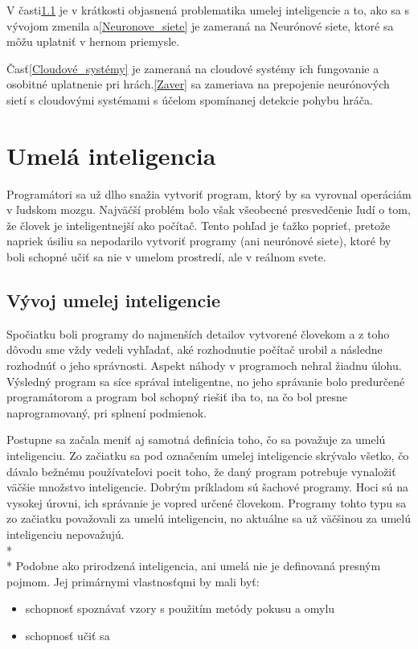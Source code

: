 \documentclass[10pt,twoside,slovak,coursepaper]{article}
\begin{document}
V časti\ref{umela_inteligencia_1} je v krátkosti objasnená problematika umelej inteligencie a to, ako sa s vývojom zmenila a\ref{Neuronove_siete} je zameraná na Neurónové siete, ktoré sa môžu uplatniť v hernom priemysle.  

Časť\ref{Cloudové_systémy} je zameraná na cloudové systémy ich fungovanie a osobitné uplatnenie pri hrách.\ref{Zaver} sa zameriava na prepojenie neurónových sietí s cloudovými systémami s účelom spomínanej detekcie pohybu hráča.

\section{Umelá inteligencia} \label{Umela_inteligencia}
Programátori sa už dlho snažia vytvoriť program, ktorý by sa vyrovnal operáciám v ľudskom mozgu. Najväčší problém bolo však všeobecné presvedčenie ľudí o tom, že človek je inteligentnejší ako počítač\cite{Kvasnička:NS}. Tento pohľad je ťažko poprieť, pretože napriek úsiliu sa nepodarilo vytvoriť programy (ani neurónové siete), ktoré by boli schopné učiť sa nie v umelom prostredí, ale v reálnom svete.
\subsection{Vývoj umelej inteligencie} \label{umela_inteligencia_1}
Spočiatku boli programy do najmenších detailov vytvorené človekom a z toho dôvodu sme vždy vedeli vyhľadať, aké rozhodnutie počítač urobil a následne rozhodnúť o jeho správnosti. Aspekt náhody v programoch nehral žiadnu úlohu. Výsledný program sa síce správal inteligentne, no jeho správanie bolo predurčené programátorom a program bol schopný riešiť iba to, na čo bol presne naprogramovaný, pri splnení podmienok. 

Postupne sa začala meniť aj samotná definícia toho, čo sa považuje za umelú inteligenciu. Zo začiatku sa pod označením umelej inteligencie skrývalo všetko, čo dávalo bežnému používateľovi pocit toho, že daný program potrebuje vynaložiť väčšie množstvo inteligencie. Dobrým príkladom sú šachové programy. Hoci sú na vysokej úrovni, ich správanie je vopred určené človekom. Programy tohto typu sa zo začiatku považovali za umelú inteligenciu, no aktuálne sa už väčšinou za umelú inteligenciu nepovažujú. 
\\*
\\*
Podobne ako prirodzená inteligencia, ani umelá nie je definovaná presným pojmom. Jej primárnymi vlastnosťqmi by mali byť:
\begin{itemize}
\item schopnosť spoznávať vzory s použitím metódy pokusu a omylu
\item schopnosť učiť sa
\end{itemize}
\end{document}
